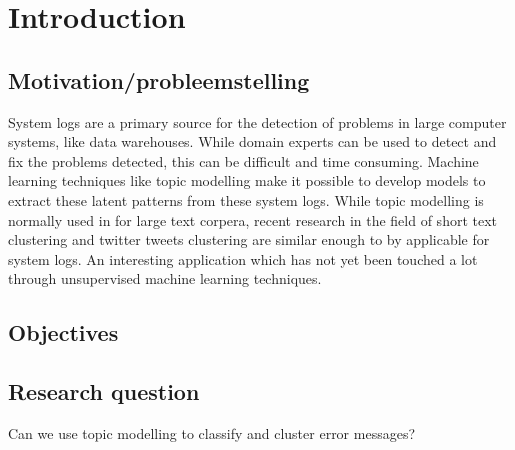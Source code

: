 \chapter{Introduction} \label{ch:introduction}
\begin{comment}
The intention of this research started with analysing the system logs to help create a model for predicting hardware and software failure for maintenance and automatic self-healing. The huge amount of system logs available from a variety of systems brought the question how to analyse and make use of the logs to predict hardware and software failure.

Current research of big data makes this a suitable problem to solve through recent machine learning techniques. 
During the time spent on this research challenges were met and identified for realising this goal and ended with the usage of Natural Language Processing (NLP) and unsupervised learning.  The untapped amount of raw data makes it possible for many more application, but in further paragraphs it will be made clear why NLP was chosen and what more could be applied on this Big data problem.
 \end{comment}
 
\section{Motivation/probleemstelling}
System logs are a primary source for the detection of problems in large computer systems, like data warehouses. While domain experts can be used to detect and fix the problems detected, this can be difficult and time consuming. Machine learning techniques like topic modelling make it possible to develop models to extract these latent patterns from these system logs. While topic modelling is normally used in for large text corpera, recent research in the field of short text clustering and twitter tweets clustering are similar enough to by applicable for system logs. An interesting application which has not yet been touched a lot through unsupervised machine learning techniques.

\section{Objectives}


\section{Research question}
Can we use topic modelling to classify and cluster error messages?

